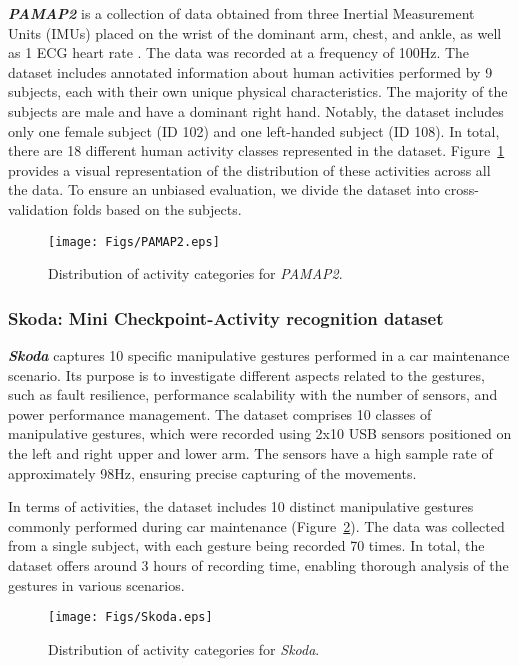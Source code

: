 \documentclass[twoside,11pt,preprint]{article}
\begin{document}
\textbf{\textit{PAMAP2}} is a collection of data obtained from three Inertial Measurement Units (IMUs) placed on the wrist of the dominant arm, chest, and ankle, as well as 1 ECG heart rate \citep{PAMAP2-2012}. The data was recorded at a frequency of 100Hz. The dataset includes annotated information about human activities performed by 9 subjects, each with their own unique physical characteristics. The majority of the subjects are male and have a dominant right hand. Notably, the dataset includes only one female subject (ID 102) and one left-handed subject (ID 108). In total, there are 18 different human activity classes represented in the dataset. Figure~\ref{fig:distrib_PAMAP2} provides a visual representation of the distribution of these activities across all the data. To ensure an unbiased evaluation, we divide the dataset into cross-validation folds based on the subjects.

\begin{figure}
\centering
     \texttt{[image: Figs/PAMAP2.eps]}
     \caption{Distribution of activity categories for \textit{PAMAP2}.}
     \label{fig:distrib_PAMAP2}
\end{figure}

\subsubsection{Skoda: Mini Checkpoint-Activity recognition dataset}

\textbf{\textit{Skoda}} captures 10 specific manipulative gestures performed in a car maintenance scenario. Its purpose is to investigate different aspects related to the gestures, such as fault resilience, performance scalability with the number of sensors, and power performance management. The dataset comprises 10 classes of manipulative gestures, which were recorded using 2x10 USB sensors positioned on the left and right upper and lower arm. The sensors have a high sample rate of approximately 98Hz, ensuring precise capturing of the movements.

In terms of activities, the dataset includes 10 distinct manipulative gestures commonly performed during car maintenance (Figure~\ref{fig:distrib_SKODA}). The data was collected from a single subject, with each gesture being recorded 70 times. In total, the dataset offers around 3 hours of recording time, enabling thorough analysis of the gestures in various scenarios.

\begin{figure}
\centering
     \texttt{[image: Figs/Skoda.eps]}
     \caption{Distribution of activity categories for \textit{Skoda}.}
     \label{fig:distrib_SKODA}
\end{figure}
\end{document}
